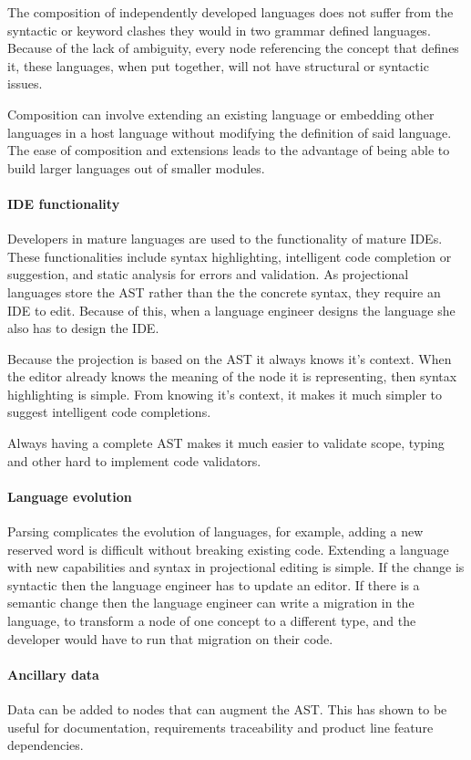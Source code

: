 The composition of independently developed languages does not suffer from the syntactic or keyword clashes they would in two grammar defined languages.
Because of the lack of ambiguity, every node referencing the concept that defines it, these languages, when put together, will not have structural or syntactic issues.

Composition can involve extending an existing language or embedding other languages in a host language without modifying the definition of said language.
The ease of composition and extensions leads to the advantage of being able to build larger languages out of smaller modules.

\paragraph{IDE functionality}
Developers in mature languages are used to the functionality of mature IDEs.
These functionalities include syntax highlighting, intelligent code completion or suggestion, and static analysis for errors and validation.
As projectional languages store the AST rather than the the concrete syntax, they require an IDE to edit.
Because of this, when a language engineer designs the language she also has to design the IDE.

Because the projection is based on the AST it always knows it's context.
When the editor already knows the meaning of the node it is representing, then syntax highlighting is simple.
From knowing it's context, it makes it much simpler to suggest intelligent code completions.

Always having a complete AST makes it much easier to validate scope, typing and other hard to implement code validators.

\paragraph{Language evolution}
Parsing complicates the evolution of languages, for example, adding a new reserved word is difficult without breaking existing code.
Extending a language with new capabilities and syntax in projectional editing is simple.
If the change is syntactic then the language engineer has to update an editor.
If there is a semantic change then the language engineer can write a migration in the language, to transform a node of one concept to a different type, and the developer would have to run that migration on their code.

\paragraph{Ancillary data}
Data can be added to nodes that can augment the AST.
This has shown to be useful for documentation, requirements traceability and product line feature dependencies.

